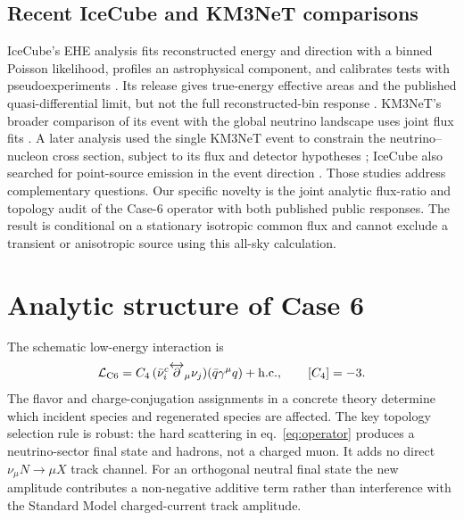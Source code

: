 \documentclass[11pt,a4paper]{article}
\begin{document}
\subsection{Recent IceCube and KM3NeT comparisons}
IceCube's EHE analysis fits reconstructed energy and direction with a binned
Poisson likelihood, profiles an astrophysical component, and calibrates
tests with pseudoexperiments \cite{IceCube:2025EHE}.  Its release gives
true-energy effective areas and the published quasi-differential limit,
but not the full reconstructed-bin response \cite{IceCube:2025Data}.
KM3NeT's broader comparison of its event with the global neutrino landscape
uses joint flux fits \cite{KM3NeT:2025Landscape}.  A later analysis used
the single KM3NeT event to constrain the neutrino--nucleon cross section,
subject to its flux and detector hypotheses \cite{Bertolez:2026}; IceCube
also searched for point-source emission in the event direction
\cite{IceCube:2026PointSource}.  Those studies address complementary
questions.  Our specific novelty is the joint analytic flux-ratio and
topology audit of the Case-6 operator with both published public responses.
The result is conditional on a stationary isotropic common flux and cannot
exclude a transient or anisotropic source using this all-sky calculation.

\section{Analytic structure of Case 6}
The schematic low-energy interaction is
\begin{equation}
 {\cal L}_{\mathrm{C6}}= C_4\,
 (\bar\nu_i^{c}\overleftrightarrow{\partial}_{\mu}\nu_j)
 (\bar q\gamma^{\mu}q)+\mathrm{h.c.},\qquad [C_4]=-3.
 \label{eq:operator}
\end{equation}
The flavor and charge-conjugation assignments in a concrete theory determine
which incident species and regenerated species are affected.  The key
topology selection rule is robust: the hard scattering in
eq.~\eqref{eq:operator} produces a neutrino-sector final state and hadrons,
not a charged muon.  It adds no direct $\nu_\mu N\to\mu X$ track channel.
For an orthogonal neutral final state the new amplitude contributes a
non-negative additive term rather than interference with the Standard Model
charged-current track amplitude.
\end{document}
